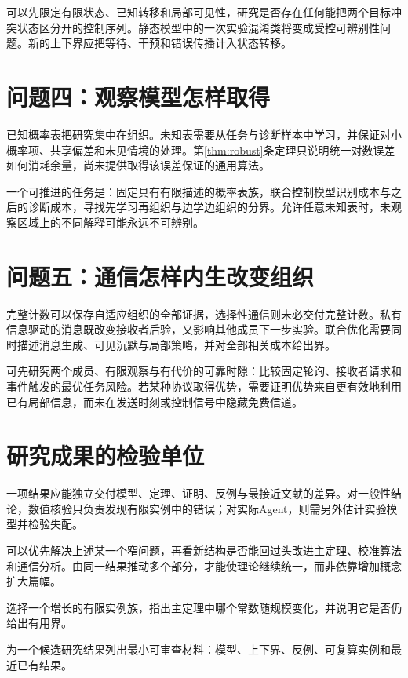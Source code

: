 可以先限定有限状态、已知转移和局部可见性，研究是否存在任何能把两个目标冲突状态区分开的控制序列。静态模型中的一次实验混淆类将变成受控可辨别性问题。新的上下界应把等待、干预和错误传播计入状态转移。

\section{问题四：观察模型怎样取得}
已知概率表把研究集中在组织。未知表需要从任务与诊断样本中学习，并保证对小概率项、共享偏差和未见情境的处理。第\ref{thm:robust}条定理只说明统一对数误差如何消耗余量，尚未提供取得该误差保证的通用算法。

一个可推进的任务是：固定具有有限描述的概率表族，联合控制模型识别成本与之后的诊断成本，寻找先学习再组织与边学边组织的分界。允许任意未知表时，未观察区域上的不同解释可能永远不可辨别。

\section{问题五：通信怎样内生改变组织}
完整计数可以保存自适应组织的全部证据，选择性通信则未必交付完整计数。私有信息驱动的消息既改变接收者后验，又影响其他成员下一步实验。联合优化需要同时描述消息生成、可见沉默与局部策略，并对全部相关成本给出界。

可先研究两个成员、有限观察与有代价的可靠时隙：比较固定轮询、接收者请求和事件触发的最优任务风险。若某种协议取得优势，需要证明优势来自更有效地利用已有局部信息，而未在发送时刻或控制信号中隐藏免费信道。

\section{研究成果的检验单位}
一项结果应能独立交付模型、定理、证明、反例与最接近文献的差异。对一般性结论，数值核验只负责发现有限实例中的错误；对实际Agent，则需另外估计实验模型并检验失配。

可以优先解决上述某一个窄问题，再看新结构是否能回过头改进主定理、校准算法和通信分析。由同一结果推动多个部分，才能使理论继续统一，而非依靠增加概念扩大篇幅。

\begin{exercise}选择一个增长的有限实例族，指出主定理中哪个常数随规模变化，并说明它是否仍给出有用界。\end{exercise}
\begin{exercise}为一个候选研究结果列出最小可审查材料：模型、上下界、反例、可复算实例和最近已有结果。\end{exercise}

